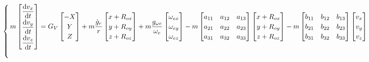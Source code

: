 \begin{equation}
	\begin{cases}
		\, m 
		\begin{bmatrix}
			\dfrac{{\rm{d}} v_x}{{\rm{d}} t} \\[0.5em]
			\dfrac{{\rm{d}} v_y}{{\rm{d}} t} \\[0.5em]
			\dfrac{{\rm{d}} v_z}{{\rm{d}} t}
		\end{bmatrix}
		= G_V
		\begin{bmatrix}
			-X\\
			Y \\
			Z
		\end{bmatrix}
		+ m \dfrac{\dot{g}_r}{r}
		\begin{bmatrix}
			x  + R_{ox} \\
			y + R_{oy} \\
			z + R_{oz}
		\end{bmatrix}
		+ m \dfrac{g_{\omega e}}{\omega_e}
		\begin{bmatrix}
			\omega_{ex} \\
			\omega_{ey} \\
			\omega_{ez}
		\end{bmatrix}
		- m
		\begin{bmatrix}
			a_{11} & a_{12} & a_{13} \\
			a_{21} & a_{22} & a_{23} \\
			a_{31} & a_{32} & a_{33}
		\end{bmatrix}
		\begin{bmatrix}
			x  + R_{ox} \\
			y + R_{oy} \\
			z + R_{oz}
		\end{bmatrix}
		 - m
		 \begin{bmatrix}
		 	b_{11} & b_{12} & b_{13} \\
		 	b_{21} & b_{22} & b_{23} \\
		 	b_{31} & b_{32} & b_{33}
		 \end{bmatrix}
	 	\begin{bmatrix}
	 		v_x \\
	 		v_y \\
	 		v_z
	 	\end{bmatrix} 
 	\\[4em]
 	

\end{cases}
\end{equation}
